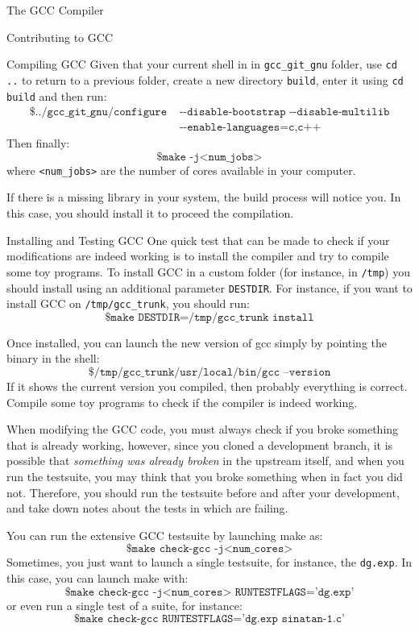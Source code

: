 \begin{section}{The GCC Compiler}
\begin{section}{Contributing to GCC}
\begin{subsection}{Compiling GCC}
Given that your current shell in in \texttt{gcc\_git\_gnu} folder, use \texttt{cd ..}
to return to a previous folder, create a new directory \texttt{build}, enter it
using \texttt{cd build} and then run:
\begin{align}
\texttt{\$ ../gcc\_git\_gnu/configure} & \texttt{ -{}-disable-bootstrap -{}-disable-multilib} \nonumber \\
& \texttt{ -{}-enable-languages=c,c++} \nonumber
\end{align}
Then finally:
$$\texttt{\$ make -j<num\_jobs>}$$
where \texttt{<num\_jobs>} are the number of cores available in your computer.

If there is a missing library in your system, the build process will notice
you. In this case, you should install it to proceed the compilation.
\end{subsection}

\begin{subsection}{Installing and Testing GCC}
One quick test that can be made to check if your modifications are indeed
working is to install the compiler and try to compile some toy programs.
To install GCC in a custom folder (for instance, in \texttt{/tmp}) you
should install using an additional parameter \texttt{DESTDIR}. For instance,
if you want to install GCC on \texttt{/tmp/gcc\_trunk}, you should run:
$$\texttt{\$ make DESTDIR=/tmp/gcc\_trunk install}$$

Once installed, you can launch the new version of gcc simply by pointing
the binary in the shell:
$$\texttt{\$ /tmp/gcc\_trunk/usr/local/bin/gcc --version}$$
If it shows the current version you compiled, then probably everything is
correct. Compile some toy programs to check if the compiler is indeed working.

When modifying the GCC code, you must always check if you broke something
that is already working, however, since you cloned a development branch,
it is possible that \textit{something was already broken} in the upstream
itself, and when you
run the testsuite, you may think that you broke something when in fact
you did not. Therefore, you should run the testsuite before and after your
development, and take down notes about the tests in which are failing.

You can run the extensive GCC testsuite by launching make as:
$$\texttt{\$ make check-gcc -j<num\_cores>}$$
Sometimes, you just want to launch a single testsuite, for instance,
the \texttt{dg.exp}. In this case, you can launch make with:
$$\texttt{\$ make check-gcc -j<num\_cores> RUNTESTFLAGS='dg.exp'}$$
or even run a single test of a suite, for instance:
$$\texttt{\$ make check-gcc RUNTESTFLAGS='dg.exp sinatan-1.c'}$$


\end{subsection}
\end{section}
\end{section}
